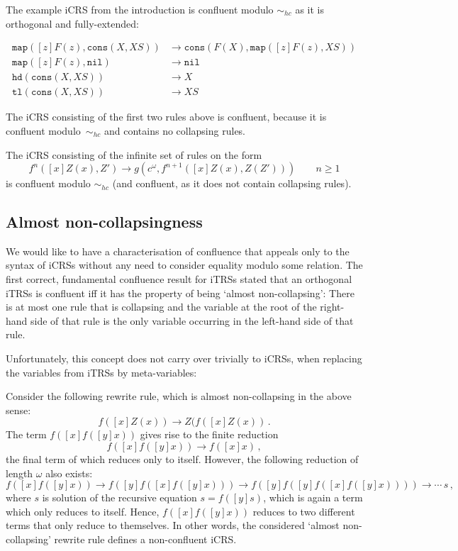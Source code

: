 \documentclass{LMCS}
\theoremstyle{plain}
\theoremstyle{definition}
\newcommand{\rew}{\rightarrow}
\newcommand{\simhc}{\sim_{hc}}
\begin{document}
\begin{exa}
The example iCRS from the introduction is confluent modulo $\simhc$
as it is orthogonal and fully-extended:

\begin{align*}
\mathtt{map}([z]F(z),\mathtt{cons}(X,XS)) & \rew
\mathtt{cons}(F(X),\mathtt{map}([z]F(z),XS)) \\
\mathtt{map}([z]F(z),\mathtt{nil}) & \rew \mathtt{nil}\\
\mathtt{hd}(\mathtt{cons}(X,XS)) & \rew X \\
\mathtt{tl}(\mathtt{cons}(X,XS)) & \rew XS
\end{align*}

The iCRS consisting of the first two rules above is confluent, because
it is confluent modulo~$\simhc$ and contains no collapsing rules.


The iCRS consisting of the infinite set of rules 
on the form 
\[
f^n([x]Z(x),Z') \rightarrow g(c^\omega,f^{n+1}([x]Z(x),Z(Z'))) \qquad n \geq 1
\]
is confluent modulo $\simhc$ (and confluent, as it does not contain collapsing rules).
\end{exa}


\subsection{Almost non-collapsingness}
\label{sec:almost_non_collapsing}

We would like to have a characterisation of confluence that appeals
only to the syntax of iCRSs without any need to consider 
equality modulo some relation. The first correct, fundamental
confluence result for iTRSs \cite{KKSV95} stated that 
an orthogonal iTRSs is confluent if{f} it has the property
of being `almost non-collapsing': There is at most one 
rule that is collapsing and the variable at the root of the
right-hand side of that rule is the only variable occurring in the left-hand
side of that rule.

Unfortunately, this concept does not carry over trivially to iCRSs,
when replacing the variables from iTRSs by meta-variables:
\begin{exa}
Consider the following rewrite rule, which is almost non-col\-laps\-ing in the above sense:
\[
f([x]Z(x)) \rew Z(f([x]Z(x)) \, .
\]
The term $f([x]f([y]x))$ gives rise to the finite reduction
\[
f([x]f([y]x)) \rew f([x]x) \, ,
\]
the final term of which reduces only to itself. However, the following reduction of length $\omega$ also exists:
\[
f([x]f([y]x)) \rew f([y]f([x]f([y]x))) \rew f([y]f([y]f([x]f([y]x)))) \rew \cdots \, s \, ,
\]
where $s$ is solution of the recursive equation $s = f([y]s)$, which is again a term which only reduces to itself. Hence, $f([x]f([y]x))$ reduces to two different terms that only reduce to themselves. In other words, the considered `almost non-collapsing' rewrite rule defines a non-confluent iCRS.
\end{exa}
\end{document}
